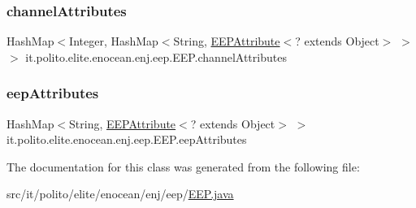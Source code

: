 \subsubsection{\texorpdfstring{channel\+Attributes}{channelAttributes}}
{\footnotesize\ttfamily Hash\+Map$<$Integer, Hash\+Map$<$String, \hyperlink{classit_1_1polito_1_1elite_1_1enocean_1_1enj_1_1eep_1_1_e_e_p_attribute}{E\+E\+P\+Attribute}$<$? extends Object$>$ $>$ $>$ it.\+polito.\+elite.\+enocean.\+enj.\+eep.\+E\+E\+P.\+channel\+Attributes\hspace{0.3cm}{\ttfamily [protected]}}

\hypertarget{classit_1_1polito_1_1elite_1_1enocean_1_1enj_1_1eep_1_1_e_e_p_af51f35cb6325e71d645bddaf87f059bf}{}\label{classit_1_1polito_1_1elite_1_1enocean_1_1enj_1_1eep_1_1_e_e_p_af51f35cb6325e71d645bddaf87f059bf} 
\subsubsection{\texorpdfstring{eep\+Attributes}{eepAttributes}}
{\footnotesize\ttfamily Hash\+Map$<$String, \hyperlink{classit_1_1polito_1_1elite_1_1enocean_1_1enj_1_1eep_1_1_e_e_p_attribute}{E\+E\+P\+Attribute}$<$? extends Object$>$ $>$ it.\+polito.\+elite.\+enocean.\+enj.\+eep.\+E\+E\+P.\+eep\+Attributes\hspace{0.3cm}{\ttfamily [protected]}}



The documentation for this class was generated from the following file\+:\begin{DoxyCompactItemize}
\item 
src/it/polito/elite/enocean/enj/eep/\hyperlink{_e_e_p_8java}{E\+E\+P.\+java}\end{DoxyCompactItemize}
